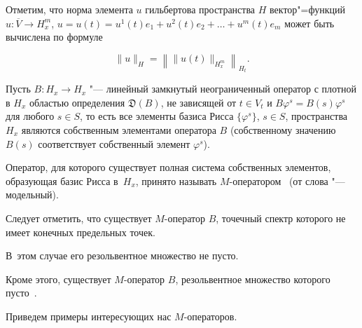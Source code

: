 Отметим, что норма элемента $u$ гильбертова пространства $H$ вектор"=функций $u:\overline V\to H_x^m$, $u=u(t)=u^1(t)e_1+ u^2(t)e_2+\dots+u^m(t)e_m$ может быть вычислена по формуле

$$\|u\|_H=\left\|\|u(t)\|_{H_x^m}\right\|_{H_t}.$$





\smallskip




Пусть $B:H_x\to H_x$ "--- линейный замкнутый неограниченный оператор с плотной в $H_x$ областью определения $\mathfrak{D}(B)$, не зависящей от $t\in V_t$ и $B\varphi^s=B(s)\varphi^s$ для любого $s\in S$, то есть все элементы базиса Рисса $\{\varphi^s\}$, $s\in S$, пространства $H_x$ являются собственным элементами оператора $B$ (собственному значению $B(s)$ соответствует собственный элемент $\varphi^s$). 

Оператор, для которого существует полная система собственных элементов, образующая базис Рисса в~$H_x$, принято называть $M$-оператором~\cite{kor:bib2} (от слова "--- модельный). 

Следует отметить, что существует $M$-оператор $B$, точечный спектр которого не имеет конечных предельных точек. 

В~этом случае его резольвентное множество не пусто. 

Кроме этого, существует $M$-оператор $B$, резольвентное множество которого пусто~\cite{kor:bib2}. 

Приведем примеры интересующих нас $M$-операторов.



